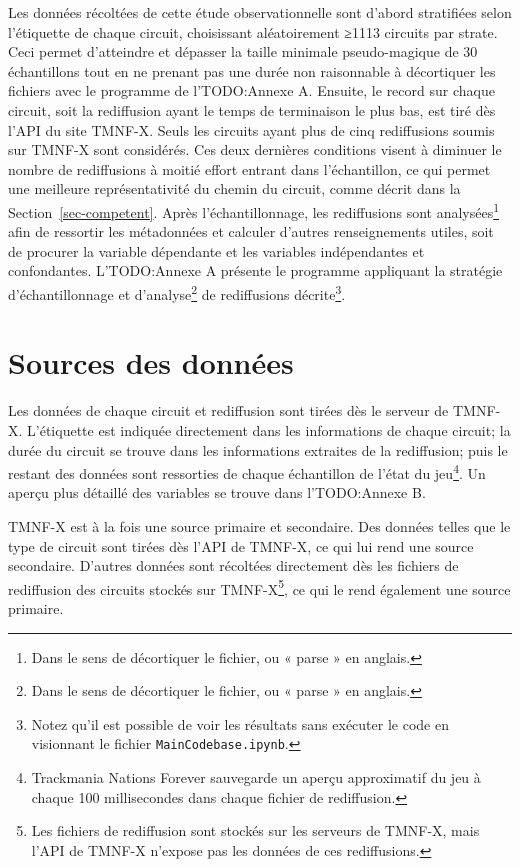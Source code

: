 \documentclass[
  oneside,
  open=any]{scrreprt}
\begin{document}
Les données récoltées de cette étude observationnelle sont d'abord
stratifiées selon l'étiquette de chaque circuit, choisissant
aléatoirement ≥1113 circuits par strate. Ceci permet d'atteindre et
dépasser la taille minimale pseudo-magique de 30 échantillons tout en ne
prenant pas une durée non raisonnable à décortiquer les fichiers avec le
programme de l'TODO:Annexe A. Ensuite, le record sur chaque circuit,
soit la rediffusion ayant le temps de terminaison le plus bas, est tiré
dès l'API du site TMNF-X. Seuls les circuits ayant plus de cinq
rediffusions soumis sur TMNF-X sont considérés. Ces deux dernières
conditions visent à diminuer le nombre de rediffusions à moitié effort
entrant dans l'échantillon, ce qui permet une meilleure représentativité
du chemin du circuit, comme décrit dans la Section~\ref{sec-competent}.
Après l'échantillonnage, les rediffusions sont analysées\footnote{Dans
  le sens de décortiquer le fichier, ou « parse » en anglais.} afin de
ressortir les métadonnées et calculer d'autres renseignements utiles,
soit de procurer la variable dépendante et les variables indépendantes
et confondantes. L'TODO:Annexe A présente le programme appliquant la
stratégie d'échantillonnage et d'analyse\footnote{Dans le sens de
  décortiquer le fichier, ou « parse » en anglais.} de rediffusions
décrite\footnote{Notez qu'il est possible de voir les résultats sans
  exécuter le code en visionnant le fichier \texttt{MainCodebase.ipynb}.}.

\section{Sources des données}\label{sources-des-donnuxe9es}

Les données de chaque circuit et rediffusion sont tirées dès le serveur
de TMNF-X. L'étiquette est indiquée directement dans les informations de
chaque circuit; la durée du circuit se trouve dans les informations
extraites de la rediffusion; puis le restant des données sont ressorties
de chaque échantillon de l'état du jeu\footnote{Trackmania Nations
  Forever sauvegarde un aperçu approximatif du jeu à chaque 100
  millisecondes dans chaque fichier de rediffusion.}. Un aperçu plus
détaillé des variables se trouve dans l'TODO:Annexe B.

TMNF-X est à la fois une source primaire et secondaire. Des données
telles que le type de circuit sont tirées dès l'API de TMNF-X, ce qui
lui rend une source secondaire. D'autres données sont récoltées
directement dès les fichiers de rediffusion des circuits stockés sur
TMNF-X\footnote{Les fichiers de rediffusion sont stockés sur les
  serveurs de TMNF-X, mais l'API de TMNF-X n'expose pas les données de
  ces rediffusions.}, ce qui le rend également une source primaire.
\end{document}
